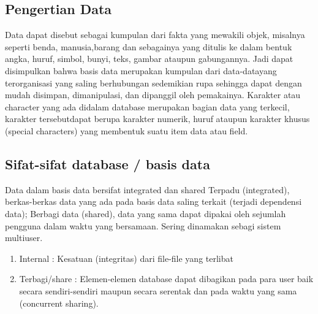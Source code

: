 \subsection{Pengertian Data}
	Data dapat disebut sebagai kumpulan dari fakta yang mewakili objek, misalnya seperti benda, manusia,barang dan sebagainya yang ditulis ke dalam bentuk angka, huruf, simbol, bunyi, teks, gambar ataupun gabungannya. Jadi dapat disimpulkan bahwa basis data merupakan kumpulan dari data-datayang terorganisasi yang saling berhubungan sedemikian rupa sehingga dapat dengan mudah disimpan, dimanipulasi, dan dipanggil oleh pemakainya. Karakter atau character yang ada didalam database merupakan bagian data yang terkecil, karakter tersebutdapat berupa karakter numerik, huruf ataupun karakter khusus (special characters) yang membentuk suatu item data atau field.

\subsection{Sifat-sifat database / basis data}
	Data dalam basis data bersifat integrated dan shared Terpadu (integrated), berkas-berkas data yang ada pada basis data saling terkait (terjadi dependensi data);
	Berbagi data (shared), data yang sama dapat dipakai oleh sejumlah pengguna dalam waktu yang bersamaan. Sering dinamakan sebagi sistem multiuser.

	\begin{enumerate}
		\item Internal : 
			Kesatuan (integritas) dari file-file yang terlibat

		\item Terbagi/share : 
			Elemen-elemen database dapat dibagikan pada para user baik secara sendiri-sendiri maupun secara serentak dan pada waktu yang sama (concurrent sharing).
	\end{enumerate}
	\vspace{12pt}
 
